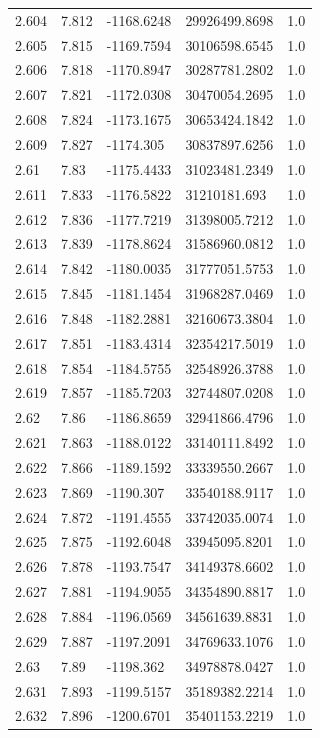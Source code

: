 \begin{tabular}{lllll}
2.604 & 7.812 & -1168.6248 & 29926499.8698 & 1.0 \\
2.605 & 7.815 & -1169.7594 & 30106598.6545 & 1.0 \\
2.606 & 7.818 & -1170.8947 & 30287781.2802 & 1.0 \\
2.607 & 7.821 & -1172.0308 & 30470054.2695 & 1.0 \\
2.608 & 7.824 & -1173.1675 & 30653424.1842 & 1.0 \\
2.609 & 7.827 & -1174.305 & 30837897.6256 & 1.0 \\
2.61 & 7.83 & -1175.4433 & 31023481.2349 & 1.0 \\
2.611 & 7.833 & -1176.5822 & 31210181.693 & 1.0 \\
2.612 & 7.836 & -1177.7219 & 31398005.7212 & 1.0 \\
2.613 & 7.839 & -1178.8624 & 31586960.0812 & 1.0 \\
2.614 & 7.842 & -1180.0035 & 31777051.5753 & 1.0 \\
2.615 & 7.845 & -1181.1454 & 31968287.0469 & 1.0 \\
2.616 & 7.848 & -1182.2881 & 32160673.3804 & 1.0 \\
2.617 & 7.851 & -1183.4314 & 32354217.5019 & 1.0 \\
2.618 & 7.854 & -1184.5755 & 32548926.3788 & 1.0 \\
2.619 & 7.857 & -1185.7203 & 32744807.0208 & 1.0 \\
2.62 & 7.86 & -1186.8659 & 32941866.4796 & 1.0 \\
2.621 & 7.863 & -1188.0122 & 33140111.8492 & 1.0 \\
2.622 & 7.866 & -1189.1592 & 33339550.2667 & 1.0 \\
2.623 & 7.869 & -1190.307 & 33540188.9117 & 1.0 \\
2.624 & 7.872 & -1191.4555 & 33742035.0074 & 1.0 \\
2.625 & 7.875 & -1192.6048 & 33945095.8201 & 1.0 \\
2.626 & 7.878 & -1193.7547 & 34149378.6602 & 1.0 \\
2.627 & 7.881 & -1194.9055 & 34354890.8817 & 1.0 \\
2.628 & 7.884 & -1196.0569 & 34561639.8831 & 1.0 \\
2.629 & 7.887 & -1197.2091 & 34769633.1076 & 1.0 \\
2.63 & 7.89 & -1198.362 & 34978878.0427 & 1.0 \\
2.631 & 7.893 & -1199.5157 & 35189382.2214 & 1.0 \\
2.632 & 7.896 & -1200.6701 & 35401153.2219 & 1.0 \\

\end{tabular}
